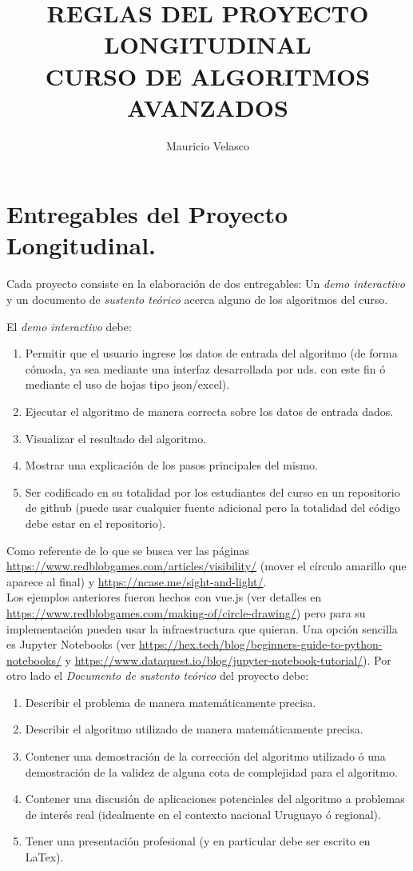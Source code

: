 \documentclass[12pt, a4paper]{article}
\date{}
\begin{document}
\title{REGLAS DEL PROYECTO LONGITUDINAL\\ CURSO DE ALGORITMOS AVANZADOS}
\author{Mauricio Velasco}
\maketitle
\section{Entregables del Proyecto Longitudinal.}

Cada proyecto consiste en la elaboraci\'on de dos entregables: Un {\it demo interactivo} y un documento de {\it sustento te\'orico} acerca alguno de los algoritmos del curso. 

\noindent
El {\it demo interactivo} debe:
\begin{enumerate}
\item Permitir que el usuario ingrese los datos de entrada del algoritmo (de forma c\'omoda, ya sea mediante una interfaz desarrollada por uds. con este fin \'o mediante el uso de hojas tipo json/excel).
\item Ejecutar el algoritmo de manera correcta sobre los datos de entrada dados.
\item Visualizar el resultado del algoritmo.
\item Mostrar una explicaci\'on de los pasos principales del mismo.
\item Ser codificado en su totalidad por los estudiantes del curso en un repositorio de github (puede usar cualquier fuente adicional pero la totalidad del c\'odigo debe estar en el repositorio).
\end{enumerate}
Como referente de lo que se busca ver las p\'aginas 
 \url{https://www.redblobgames.com/articles/visibility/} (mover el c\'irculo amarillo que aparece al final) y \url{https://ncase.me/sight-and-light/}.\\
Los ejemplos anteriores fueron hechos con {\rm vue.js} (ver detalles en \url{https://www.redblobgames.com/making-of/circle-drawing/}) pero para su implementaci\'on pueden usar la infraestructura que quieran. Una opci\'on sencilla es Jupyter Notebooks (ver \url{https://hex.tech/blog/beginners-guide-to-python-notebooks/} y \url{https://www.dataquest.io/blog/jupyter-notebook-tutorial/}).
\newpage
Por otro lado el {\it Documento de sustento te\'orico} del proyecto debe:
\begin{enumerate}
\item Describir el problema de manera matem\'aticamente precisa.
\item Describir el algoritmo utilizado de manera matem\'aticamente precisa.
\item Contener una demostraci\'on de la correcci\'on del algoritmo utilizado \'o una demostraci\'on de la validez de alguna cota de complejidad para el algoritmo.
\item Contener una discusi\'on de aplicaciones potenciales del algoritmo a problemas de inter\'es real (idealmente en el contexto nacional Uruguayo \'o regional).
\item Tener una presentaci\'on profesional (y en particular debe ser escrito en LaTex).
\end{enumerate}
\end{document}
